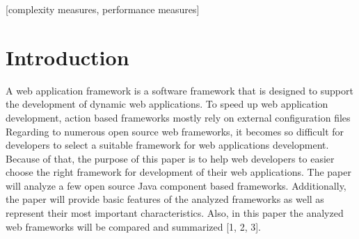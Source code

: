 \documentclass{sig-alternate}
\begin{document}
[complexity measures, performance measures]









\section{Introduction}
A web application framework is a software framework that is designed to support the development of dynamic web applications.
To speed up web application development, action based frameworks mostly rely on external configuration files
Regarding to numerous open source web frameworks, it becomes so difficult for developers to select a suitable framework for web applications development. Because of that, the purpose of this paper is to help web developers to easier choose the right framework for development of their web applications. The paper will analyze a few open source Java component based frameworks. Additionally, the paper will provide basic features of the analyzed frameworks as well as represent their most important characteristics. Also, in this paper the analyzed web frameworks will be compared and summarized [1, 2, 3].
\end{document}
